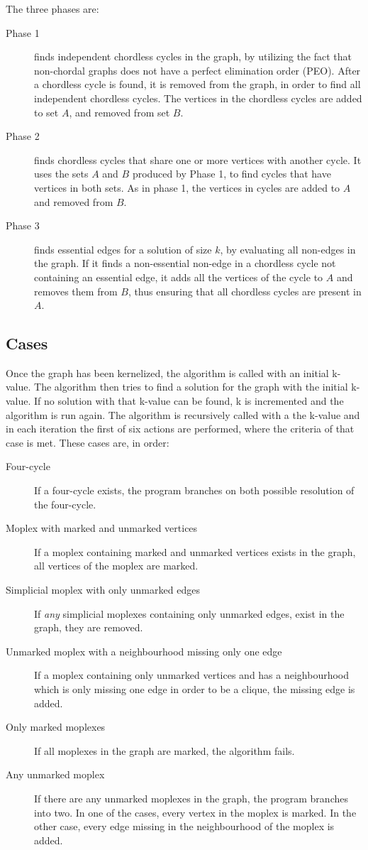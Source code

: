 \documentclass{article}
\begin{document}
		The three phases are:
		\begin{description}
			\item[Phase 1] finds independent chordless cycles in the graph, by utilizing the fact that non-chordal graphs does not have a perfect elimination order (PEO). After a chordless cycle is found, it is removed from the graph, in order to find all independent chordless cycles. The vertices in the chordless cycles are added to set $A$, and removed from set $B$.
			\item[Phase 2] finds chordless cycles that share one or more vertices with another cycle. It uses the sets $A$ and $B$ produced by Phase 1, to find cycles that have vertices in both sets. As in phase 1, the vertices in cycles are added to $A$ and removed from $B$.
			\item[Phase 3] finds essential edges for a solution of size $k$, by evaluating all non-edges in the graph. If it finds a non-essential non-edge in a chordless cycle not containing an essential edge, it adds all the vertices of the cycle to $A$ and removes them from $B$, thus ensuring that all chordless cycles are present in $A$.
		\end{description}

		\subsection{Cases} 
		Once the graph has been kernelized, the algorithm is called with an initial k-value. The algorithm then tries to find a solution for the graph with the initial k-value.
		If no solution with that k-value can be found, k is incremented and the algorithm is run again.
		The algorithm is recursively called with a the k-value and in each iteration the first of six actions are performed, where the criteria of that case is met.
		These cases are, in order:
		\begin{description}
			\item[Four-cycle] If a four-cycle exists, the program branches on both possible resolution of the four-cycle.
			\item[Moplex with marked and unmarked vertices] If a moplex containing marked and unmarked vertices exists in the graph, all vertices of the moplex are marked.
			\item[Simplicial moplex with only unmarked edges] If \emph{any} simplicial moplexes containing only unmarked edges, exist in the graph, they are removed.
			\item[Unmarked moplex with a neighbourhood missing only one edge] If a moplex containing only unmarked vertices and has a neighbourhood which is only missing one edge in order to be a clique, the missing edge is added.
			\item[Only marked moplexes] If all moplexes in the graph are marked, the algorithm fails.
			\item[Any unmarked moplex] If there are any unmarked moplexes in the graph, the program branches into two. In one of the cases, every vertex in the moplex is marked. In the other case, every edge missing in the neighbourhood of the moplex is added.
		\end{description}
\end{document}
